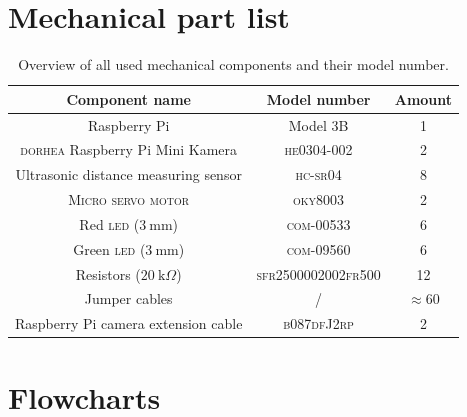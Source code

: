 \begin{appendices}
\section{Mechanical part list}\label{app:part-list}

\begin{table}[htp]
    \centering
    \caption{Overview of all used mechanical components and their model number.}
    \begin{tabular}{|c|c|c|}
        \hline
         \textbf{Component name} & \textbf{Model number} & \textbf{Amount}  \\
         \hline
         Raspberry Pi & Model 3B & 1 \\
         \hline
         \textsc{dorhea} Raspberry Pi Mini Kamera & \textsc{he0304-002} & 2 \\
         \hline
         Ultrasonic distance measuring sensor & \textsc{hc-sr04} & 8 \\
         \hline
         \textsc{Micro servo motor} & \textsc{oky8003} & 2 \\
         \hline
         Red \textsc{led} ($3 \ \text{mm}$) & \textsc{com-00533} & 6 \\
         \hline
         Green \textsc{led} ($3 \ \text{mm}$) & \textsc{com-09560} & 6 \\
         \hline
         Resistors ($20 \ \text{k}\Omega$) & \textsc{sfr2500002002fr500} & 12 \\
         \hline
         Jumper cables & / & $\approx 60$ \\
         \hline
         Raspberry Pi camera extension cable & \textsc{b087dfJ2rp} & 2 \\
         \hline
         \end{tabular}
    \label{tab:part_list}
\end{table}
\clearpage

\section{Flowcharts}\label{app:flowcharts}


\end{appendices}
